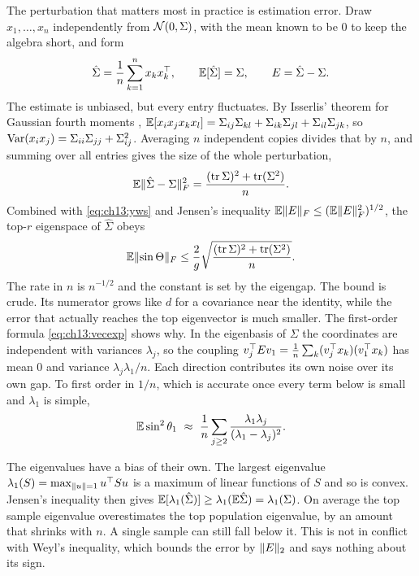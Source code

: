The perturbation that matters most in practice is estimation error. Draw
$x_1,\dots,x_n$ independently from $\mathcal{N}(0,\Sigma)$, with the mean known to be
$0$ to keep the algebra short, and form
\begin{equation}\label{eq:ch13:samplecov}
\hat\Sigma=\frac1n\sum_{k=1}^nx_kx_k^{\top},\qquad \mathbb{E}[\hat\Sigma]=\Sigma,\qquad E=\hat\Sigma-\Sigma .
\end{equation}
The estimate is unbiased, but every entry fluctuates. By Isserlis' theorem for
Gaussian fourth moments \cite{isserlis1918},
$\mathbb{E}[x_ix_jx_kx_l]=\Sigma_{ij}\Sigma_{kl}+\Sigma_{ik}\Sigma_{jl}+\Sigma_{il}\Sigma_{jk}$, so
$\operatorname{Var}(x_ix_j)=\Sigma_{ii}\Sigma_{jj}+\Sigma_{ij}^2$. Averaging $n$ independent copies
divides that by $n$, and summing over all entries gives the size of the whole
perturbation,
\begin{equation}\label{eq:ch13:frob}
\mathbb{E}\lVert \hat\Sigma-\Sigma\rVert_F^2=\frac{(\operatorname{tr}\Sigma)^2+\operatorname{tr}(\Sigma^2)}{n}.
\end{equation}
Combined with \cref{eq:ch13:yws} and Jensen's inequality
$\mathbb{E}\lVert E\rVert_F\le(\mathbb{E}\lVert E\rVert_F^2)^{1/2}$, the top-$r$ eigenspace of $\hat\Sigma$ obeys
\begin{equation}\label{eq:ch13:samplerate}
\mathbb{E}\lVert \sin\Theta\rVert_F\le\frac{2}{g}\sqrt{\frac{(\operatorname{tr}\Sigma)^2+\operatorname{tr}(\Sigma^2)}{n}} .
\end{equation}
The rate in $n$ is $n^{-1/2}$ and the constant is set by the eigengap. The bound is
crude. Its numerator grows like $d$ for a covariance near the identity, while the
error that actually reaches the top eigenvector is much smaller. The first-order
formula \cref{eq:ch13:vecexp} shows why. In the eigenbasis of $\Sigma$ the
coordinates are independent with variances $\lambda_j$, so the coupling
$v_j^{\top} Ev_1=\tfrac1n\sum_k(v_j^{\top} x_k)(v_1^{\top} x_k)$ has mean $0$ and variance
$\lambda_j\lambda_1/n$. Each direction contributes its own noise over its own gap.
To first order in $1/n$, which is accurate once every term below is small and
$\lambda_1$ is simple,
\begin{equation}\label{eq:ch13:samplefo}
\E\sin^2\theta_1\ \approx\ \frac1n\sum_{j\ge2}\frac{\lambda_1\lambda_j}{(\lambda_1-\lambda_j)^2}.
\end{equation}

The eigenvalues have a bias of their own. The largest eigenvalue
$\lambda_1(S)=\max_{\lVert u\rVert=1}u^{\top} Su$ is a maximum of linear functions of $S$ and
so is convex. Jensen's inequality then gives
$\mathbb{E}[\lambda_1(\hat\Sigma)]\ge\lambda_1(\mathbb{E}\hat\Sigma)=\lambda_1(\Sigma)$. On
average the top sample eigenvalue overestimates the top population eigenvalue,
by an amount that shrinks with $n$. A single sample can still fall below it. This is not in conflict with Weyl's inequality, which bounds
the error by $\lVert E\rVert_2$ and says nothing about its sign.

